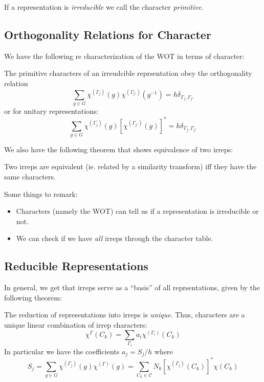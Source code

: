 \documentclass[9pt]{article}
\begin{document}
\begin{multicols}{2}
If a representation is \textit{irreducible} we call the 
character \textit{primitive}. 

\subsection{Orthogonality Relations for Character}

We have the following re characterization of the WOT in terms of 
character:

\begin{theorem}
    The primitive characters of an irreudcible reprsentation
    obey the orthogonality relation
    \begin{equation}
        \sum_{g \in G}\chi^{(\Gamma_j)}(g)\chi^{(\Gamma_{j'})}(g^{-1})=h\delta_{\Gamma_j,\Gamma_{j'}}
    \end{equation}
    or for unitary representations:
    \begin{equation}
        \sum_{g \in G}\chi^{(\Gamma_j)}(g)[\chi^{(\Gamma_{j'})}(g)]^*=h\delta_{\Gamma_j,\Gamma_{j'}}
    \end{equation}
\end{theorem}

We also have the following theorem that shows equivalence of two
irreps:

\begin{theorem}
    Two irreps are equivalent (ie. related by a similarity transform) iff they have the same characters.
\end{theorem}

Some things to remark:
\begin{itemize}
    \item Characters (namely the WOT) can tell us if a representation is irreducible or not.
    \item We can check if we have \textit{all} irreps through the
    character table.
\end{itemize}

\subsection{Reducible Representations}

In general, we get that irreps serve as a ``basis'' of all reprsentations, given by the following theorem:

\begin{theorem}
    The reduction of representations into irreps is \textit{unique}. Thus, characters are a unique linear combination of
    irrep characters:
    \begin{equation}
        \chi^{\Gamma}(C_k)=\sum_{\Gamma_i}a_i\chi^{(\Gamma_i)}(C_k)
    \end{equation}
    In particular we have the coefficients $a_j=S_j/h$ where $$S_j=\sum_{g \in G}\chi^{(\Gamma_j)}(g)\chi^{(\Gamma)}(g)
    =\sum_{C_k \in \mathcal{C}}N_k[\chi^{(\Gamma_j)}(C_k)]^*\chi(C_k)$$
\end{theorem}


\end{multicols}
\end{document}
